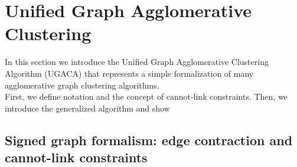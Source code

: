 \section{Unified Graph Agglomerative Clustering}
In this section we introduce the Unified Graph Agglomerative Clustering Algorithm (UGACA) that represents a simple  formalization of many agglomerative graph clustering algorithms. \\
First, we define notation and the concept of cannot-link constraints. Then, we introduce the generalized algorithm and show 

\subsection{Signed graph formalism: edge contraction and cannot-link constraints} \label{sec:contr_graph_and_CLC}


